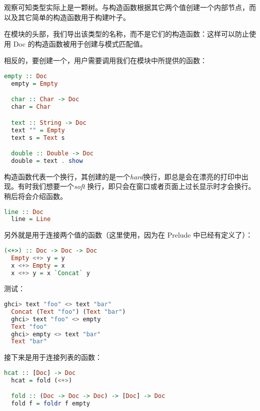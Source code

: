 \documentclass[./main.tex]{subfiles}
\begin{document}
观察可知类型实际上是一颗树。与构造函数根据其它两个值创建一个内部节点，而
以及其它简单的构造函数用于构建叶子。

在模块的头部，我们导出该类型的名称，而不是它们的构造函数：这样可以防止使用 Doc 的构造函数被用于创建与模式匹配值。

相反的，要创建一个，用户需要调用我们在模块中所提供的函数：

\begin{lstlisting}[language=Haskell]
  empty :: Doc
  empty = Empty

  char :: Char -> Doc
  char = Char

  text :: String -> Doc
  text "" = Empty
  text s = Text s

  double :: Double -> Doc
  double = text . show
\end{lstlisting}

构造函数代表一个换行，其创建的是一个\textit{hard}换行，即总是会在漂亮的打印中出现。有时我们想要一个\textit{soft}
换行，即只会在窗口或者页面上过长显示时才会换行。稍后将会介绍函数。

\begin{lstlisting}[language=Haskell]
  line :: Doc
  line = Line
\end{lstlisting}

另外就是用于连接两个值的\acode{(<>)}函数（这里使用\acode{(<+>)}，因为\acode{(<>)}在 Prelude 中已经有定义了）：

\begin{lstlisting}[language=Haskell]
  (<+>) :: Doc -> Doc -> Doc
  Empty <+> y = y
  x <+> Empty = x
  x <+> y = x `Concat` y
\end{lstlisting}

测试：

\begin{lstlisting}[language=Haskell]
  ghci> text "foo" <> text "bar"
  Concat (Text "foo") (Text "bar")
  ghci> text "foo" <> empty
  Text "foo"
  ghci> empty <> text "bar"
  Text "bar"
\end{lstlisting}

接下来是用于连接列表的函数：

\begin{lstlisting}[language=Haskell]
  hcat :: [Doc] -> Doc
  hcat = fold (<+>)

  fold :: (Doc -> Doc -> Doc) -> [Doc] -> Doc
  fold f = foldr f empty
\end{lstlisting}
\end{document}
